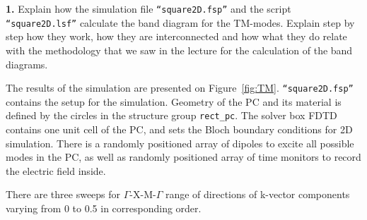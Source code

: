 \documentclass[11pt,a4paper]{article}
\begin{document}
\begin{displayquote}
    \textbf{1.} Explain how the simulation file \verb|“square2D.fsp”| and the script \verb|“square2D.lsf”| calculate the band diagram for the TM-modes. Explain step by step how they work, how they are interconnected and how what they do relate with the methodology that we saw in the lecture for the calculation of the band diagrams.
\end{displayquote}
The results of the simulation are presented on Figure~\ref{fig:TM}. 
\verb|“square2D.fsp”| contains the setup for the simulation. Geometry of the PC and its material is defined by the circles in the structure group \verb|rect_pc|. The solver box FDTD contains one unit cell of the PC, and sets the Bloch boundary conditions for 2D simulation. There is a randomly positioned array of dipoles to excite all possible modes in the PC, as well as randomly positioned array of time monitors to record the electric field inside. 

There are three sweeps for $\Gamma$-X-M-$\Gamma$ range of directions of k-vector components varying from 0 to 0.5 in corresponding order.  
\end{document}
